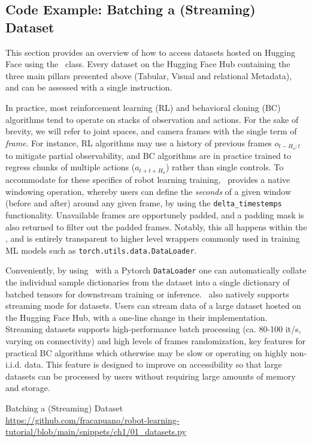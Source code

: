 \subsection{Code Example: Batching a (Streaming) Dataset}

This section provides an overview of how to access datasets hosted on Hugging Face using the \lerobotdataset~class.
Every dataset on the Hugging Face Hub containing the three main pillars presented above (Tabular, Visual and relational Metadata), and can be assessed with a single instruction.

In practice, most reinforcement learning (RL) and behavioral cloning (BC) algorithms tend to operate on stacks of observation and actions.
For the sake of brevity, we will refer to joint spaces, and camera frames with the single term of \emph{frame}.
For instance, RL algorithms may use a history of previous frames \(o_{t-H_o:t} \) to mitigate partial observability, and BC algorithms are in practice trained to regress chunks of multiple actions (\(a_{t+t+H_a} \)) rather than single controls.
To accommodate for these specifics of robot learning training, \lerobotdataset~provides a native windowing operation, whereby users can define the \emph{seconds} of a given window (before and after) around any given frame, by using the \texttt{delta\_timestemps} functionality.
Unavailable frames are opportunely padded, and a padding mask is also returned to filter out the padded frames.
Notably, this all happens within the \lerobotdataset, and is entirely transparent to higher level wrappers commonly used in training ML models such as \texttt{torch.utils.data.DataLoader}.

Conveniently, by using \lerobotdataset~with a Pytorch \texttt{DataLoader} one can automatically collate the individual sample dictionaries from the dataset into a single dictionary of batched tensors for downstream training or inference.
\lerobotdataset~also natively supports streaming mode for datasets.
Users can stream data of a large dataset hosted on the Hugging Face Hub, with a one-line change in their implementation.
Streaming datasets supports high-performance batch processing (ca. 80-100 it/s, varying on connectivity) and high levels of frames randomization, key features for practical BC algorithms which otherwise may be slow or operating on highly non-i.i.d. data.
This feature is designed to improve on accessibility so that large datasets can be processed by users without requiring large amounts of memory and storage.

\begin{pbox}[label={ex:dataset-batching}]{Batching a (Streaming) Dataset \\ \url{https://github.com/fracapuano/robot-learning-tutorial/blob/main/snippets/ch1/01_datasets.py}}
    
\end{pbox}

